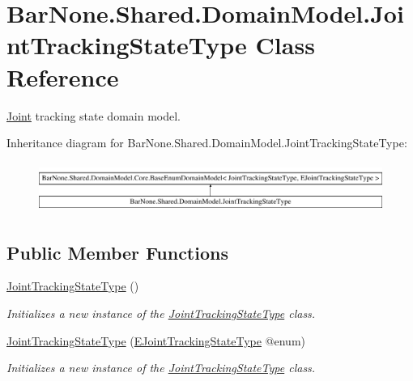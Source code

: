 \hypertarget{class_bar_none_1_1_shared_1_1_domain_model_1_1_joint_tracking_state_type}{}\section{Bar\+None.\+Shared.\+Domain\+Model.\+Joint\+Tracking\+State\+Type Class Reference}
\label{class_bar_none_1_1_shared_1_1_domain_model_1_1_joint_tracking_state_type}


\mbox{\hyperlink{class_bar_none_1_1_shared_1_1_domain_model_1_1_joint}{Joint}} tracking state domain model.  


Inheritance diagram for Bar\+None.\+Shared.\+Domain\+Model.\+Joint\+Tracking\+State\+Type\+:\begin{figure}[H]
\begin{center}
\leavevmode
\includegraphics[height=1.664190cm]{class_bar_none_1_1_shared_1_1_domain_model_1_1_joint_tracking_state_type}
\end{center}
\end{figure}
\subsection*{Public Member Functions}
\begin{DoxyCompactItemize}
\item 
\mbox{\hyperlink{class_bar_none_1_1_shared_1_1_domain_model_1_1_joint_tracking_state_type_a69b60e3e0198a14fe93afe1ed52898a1}{Joint\+Tracking\+State\+Type}} ()
\begin{DoxyCompactList}\small\item\em Initializes a new instance of the \mbox{\hyperlink{class_bar_none_1_1_shared_1_1_domain_model_1_1_joint_tracking_state_type}{Joint\+Tracking\+State\+Type}} class. \end{DoxyCompactList}\item 
\mbox{\hyperlink{class_bar_none_1_1_shared_1_1_domain_model_1_1_joint_tracking_state_type_aaa2bbd5271f753a667cc658048146459}{Joint\+Tracking\+State\+Type}} (\mbox{\hyperlink{namespace_bar_none_1_1_shared_1_1_domain_model_abfb99d1de9684cc3f024f727b2a2b487}{E\+Joint\+Tracking\+State\+Type}} @enum)
\begin{DoxyCompactList}\small\item\em Initializes a new instance of the \mbox{\hyperlink{class_bar_none_1_1_shared_1_1_domain_model_1_1_joint_tracking_state_type}{Joint\+Tracking\+State\+Type}} class. \end{DoxyCompactList}\end{DoxyCompactItemize}
